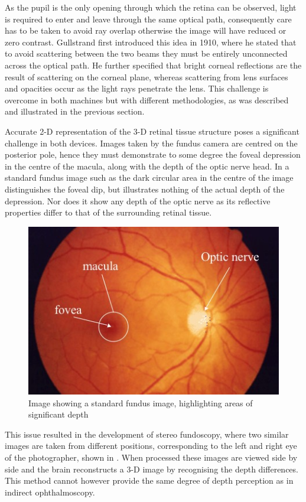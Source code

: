 As the pupil is the only opening through which the retina can be observed, light is required to enter and leave through the same optical path, consequently care has to be taken to avoid ray overlap otherwise the image will have reduced or zero contrast. Gullstrand first introduced this idea in 1910, where he stated that to avoid scattering between the two beams they must be entirely unconnected across the optical path. He further specified that bright corneal reflections are the result of scattering on the corneal plane, whereas scattering from lens surfaces and opacities occur as the light rays penetrate the lens. This challenge is overcome in both machines but with different methodologies, as was described and illustrated in the previous section. 

Accurate 2-D representation of the 3-D retinal tissue structure poses a significant challenge in both devices. Images taken by the fundus camera are centred on the posterior pole, hence they must demonstrate to some degree the foveal depression in the centre of the macula, along with the depth of the optic nerve head. In a standard fundus image such as the dark circular area in the centre of the image distinguishes the foveal dip, but illustrates nothing of the actual depth of the depression. Nor does it show any depth of the optic nerve as its reflective properties differ to that of the surrounding retinal tissue. 

\begin{figure}[htbp]
\centering
  \includegraphics{figures/normalfundus}
\caption{Image showing a  standard fundus image, highlighting areas of significant depth}
\label{fig:standard}
     \end{figure}

This issue resulted in the development of stereo fundoscopy, where two similar images are taken from different positions, corresponding to the left and right eye of the photographer, shown in . When processed these images are viewed side by side and the brain reconstructs a 3-D image by recognising the depth differences. This method cannot however provide the same degree of depth perception as in indirect ophthalmoscopy.

